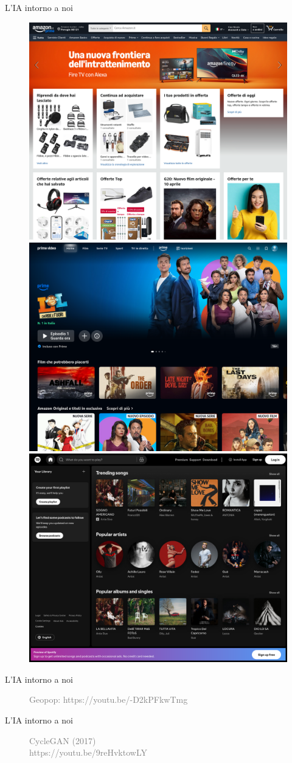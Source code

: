 \documentclass{beamer}
\begin{document}
\begin{frame}{L'IA intorno a noi}
    \begin{figure}
        \centering
        \includegraphics[width=.4\linewidth]{imgs/rec_system/amazon_recsys.png}
        \includegraphics[width=.4\linewidth]{imgs/rec_system/primevideo_recsys.png}
        \includegraphics[width=.4\linewidth]{imgs/rec_system/spotify_recsys.png}
    \end{figure}
\end{frame}

\begin{frame}{L'IA intorno a noi}
    \begin{figure}
        \centering
        \caption*{\textcolor{gray}{Geopop: https://youtu.be/-D2kPFkwTmg}}
    \end{figure}
\end{frame}

\begin{frame}{L'IA intorno a noi}
    \begin{figure}
        \centering
        \caption*{\textcolor{gray}{CycleGAN (2017)\\https://youtu.be/9reHvktowLY}}
    \end{figure}
\end{frame}
\end{document}
